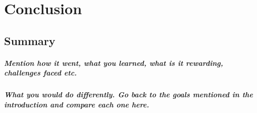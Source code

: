 \chapter{Conclusion}
\section{Summary}
\paragraph{Mention how it went, what you learned, what is it rewarding, challenges faced etc.}


\paragraph{What you would do differently. Go back to the goals mentioned in the introduction and compare each one here.}